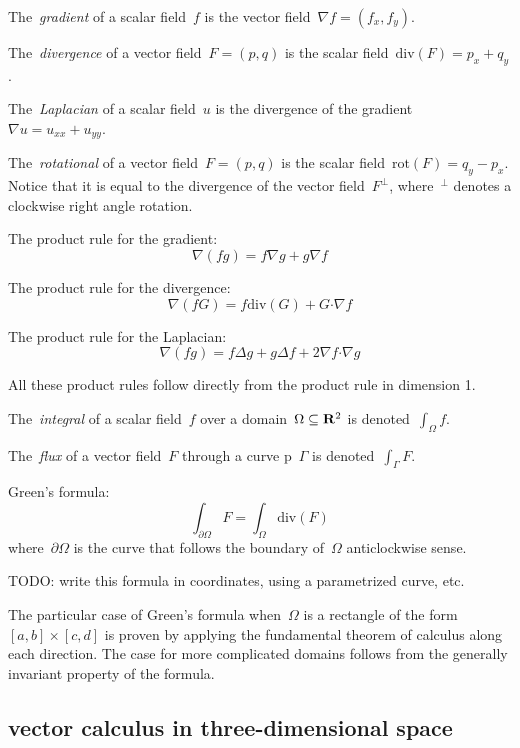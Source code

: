 The~\emph{gradient} of a scalar field~$f$ is the vector field~$\nabla
f=\left(f_x,f_y\right)$.

The~\emph{divergence} of a vector field~$F=(p,q)$ is the scalar
field~$\mathrm{div}(F)=p_x+q_y$.

The~\emph{Laplacian} of a scalar field~$u$ is the divergence of the
gradient~$\nabla u=u_{xx}+u_{yy}$.

The~\emph{rotational} of a vector field~$F=(p,q)$ is the scalar
field~$\mathrm{rot}(F)=q_y-p_x$.  Notice that it is equal to the divergence
of the vector field~$F^\perp$, where~${}^\perp$ denotes a clockwise right
angle rotation.

The product rule for the gradient:
\[
	\nabla\left(fg\right)=f\nabla g+g\nabla f
\]

The product rule for the divergence:
\[
	\nabla\left(fG\right)=f\mathrm{div}\left(G\right)+G\boldsymbol{\cdot}\nabla f
\]

The product rule for the Laplacian:
\[
	\nabla\left(fg\right)=f\Delta g+g\Delta f+2\nabla f\boldsymbol{\cdot}\nabla
	g
\]

All these product rules follow directly from the product rule in dimension 1.

The~\emph{integral} of a scalar field~$f$ over a
domain~$\Omega\subseteq\mathbf{R}^2$ is denoted~$\int_\Omega f$.

The~\emph{flux} of a vector field~$F$ through a curve
p~$\Gamma$ is denoted~$\int_\Gamma F$.

Green's formula:
\[
	\int_{\partial\Omega}F=\int_\Omega\mathrm{div}\left(F\right)
\]
where~$\partial\Omega$ is the curve that follows the boundary of~$\Omega$
anticlockwise sense.

TODO: write this formula in coordinates, using a parametrized curve, etc.

The particular case of Green's formula when~$\Omega$ is a rectangle of the
form~$[a,b]\times[c,d]$ is proven by applying the fundamental theorem of
calculus along each direction.  The case for more complicated domains follows
from the generally invariant property of the formula.

\subsection{vector calculus in three-dimensional space}


